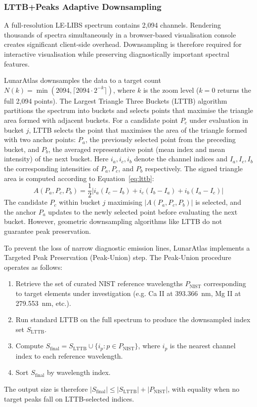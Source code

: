 \documentclass[final,5p,twocolumn,a4paper]{elsarticle}
\begin{document}
\subsubsection{LTTB+Peaks Adaptive Downsampling}
A full-resolution LE-LIBS spectrum contains 2,094 channels. Rendering thousands of spectra simultaneously in a browser-based visualisation console creates significant client-side overhead. Downsampling is therefore required for interactive visualisation while preserving diagnostically important spectral features.

LunarAtlas downsamples the data to a target count $N(k) = \min(2094, \lceil 2094 \cdot 2^{-k} \rceil)$, where $k$ is the zoom level ($k=0$ returns the full 2,094 points). The Largest Triangle Three Buckets (LTTB) algorithm \cite{steinarsson2013lttb} partitions the spectrum into buckets and selects points that maximise the triangle area formed with adjacent buckets. For a candidate point $P_c$ under evaluation in bucket $j$, LTTB selects the point that maximises the area of the triangle formed with two anchor points: $P_a$, the previously selected point from the preceding bucket, and $P_b$, the averaged representative point (mean index and mean intensity) of the next bucket. Here $i_a, i_c, i_b$ denote the channel indices and $I_a, I_c, I_b$ the corresponding intensities of $P_a, P_c$, and $P_b$ respectively. The signed triangle area is computed according to Equation~\eqref{eq:lttb}:
\begin{equation}
    \label{eq:lttb}
    A(P_a, P_c, P_b) = \frac{1}{2} |i_a(I_c - I_b) + i_c(I_b - I_a) + i_b(I_a - I_c)|
\end{equation}
The candidate $P_c$ within bucket $j$ maximising $|A(P_a, P_c, P_b)|$ is selected, and the anchor $P_a$ updates to the newly selected point before evaluating the next bucket. However, geometric downsampling algorithms like LTTB do not guarantee peak preservation.

To prevent the loss of narrow diagnostic emission lines, LunarAtlas implements a Targeted Peak Preservation (Peak-Union) step. The Peak-Union procedure operates as follows:
\begin{enumerate}
  \item Retrieve the set of curated NIST reference wavelengths $P_{\text{NIST}}$ corresponding to target elements under investigation (e.g. Ca II at 393.366~nm, Mg II at 279.553~nm, etc.).
  \item Run standard LTTB on the full spectrum to produce the downsampled index set $S_{\text{LTTB}}$.
  \item Compute $S_{\text{final}} = S_{\text{LTTB}} \cup \{i_p : p \in P_{\text{NIST}}\}$, where $i_p$ is the nearest channel index to each reference wavelength.
  \item Sort $S_{\text{final}}$ by wavelength index.
\end{enumerate}
The output size is therefore $|S_{\text{final}}| \leq |S_{\text{LTTB}}| + |P_{\text{NIST}}|$, with equality when no target peaks fall on LTTB-selected indices.
\end{document}
